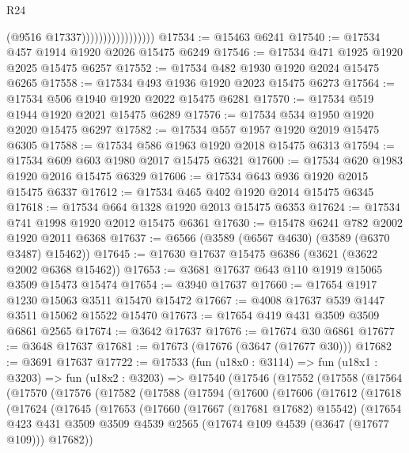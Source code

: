 \begin{lexlean}{R24}
\begin{coremodule}
                                    (@9516 @17337)))))))))))))))))
@17534 := @15463 @6241
@17540 := @17534 @457 @1914 @1920 @2026 @15475 @6249
@17546 := @17534 @471 @1925 @1920 @2025 @15475 @6257
@17552 := @17534 @482 @1930 @1920 @2024 @15475 @6265
@17558 := @17534 @493 @1936 @1920 @2023 @15475 @6273
@17564 := @17534 @506 @1940 @1920 @2022 @15475 @6281
@17570 := @17534 @519 @1944 @1920 @2021 @15475 @6289
@17576 := @17534 @534 @1950 @1920 @2020 @15475 @6297
@17582 := @17534 @557 @1957 @1920 @2019 @15475 @6305
@17588 := @17534 @586 @1963 @1920 @2018 @15475 @6313
@17594 := @17534 @609 @603 @1980 @2017 @15475 @6321
@17600 := @17534 @620 @1983 @1920 @2016 @15475 @6329
@17606 := @17534 @643 @936 @1920 @2015 @15475 @6337
@17612 := @17534 @465 @402 @1920 @2014 @15475 @6345
@17618 := @17534 @664 @1328 @1920 @2013 @15475 @6353
@17624 := @17534 @741 @1998 @1920 @2012 @15475 @6361
@17630 := @15478 @6241 @782 @2002 @1920 @2011 @6368
@17637 := @6566 (@3589 (@6567 @4630) (@3589 (@6370 @3487) @15462))
@17645 := @17630 @17637 @15475 @6386 (@3621 (@3622 @2002 @6368 @15462))
@17653 := @3681 @17637 @643 @110 @1919 @15065 @3509 @15473 @15474
@17654 := @3940 @17637
@17660 := @17654 @1917 @1230 @15063 @3511 @15470 @15472
@17667 := @4008 @17637 @539 @1447 @3511 @15062 @15522 @15470
@17673 := @17654 @419 @431 @3509 @3509 @6861 @2565
@17674 := @3642 @17637
@17676 := @17674 @30 @6861
@17677 := @3648 @17637
@17681 := @17673 (@17676 (@3647 (@17677 @30)))
@17682 := @3691 @17637
@17722 := @17533
    (fun (u18x0 : @3114) =>
    fun (u18x1 : @3203) =>
    fun (u18x2 : @3203) =>
    @17540
      (@17546
        (@17552
          (@17558
            (@17564
              (@17570
                (@17576
                  (@17582
                    (@17588
                      (@17594
                        (@17600
                          (@17606
                            (@17612
                              (@17618
                                (@17624
                                  (@17645
                                    (@17653
                                      (@17660
                                        (@17667 (@17681 @17682) @15542)
                                        (@17654
                                          @423
                                          @431
                                          @3509
                                          @3509
                                          @4539
                                          @2565
                                          (@17674 @109 @4539 (@3647 (@17677 @109)))
                                          @17682))

\end{coremodule}
\end{lexlean}
